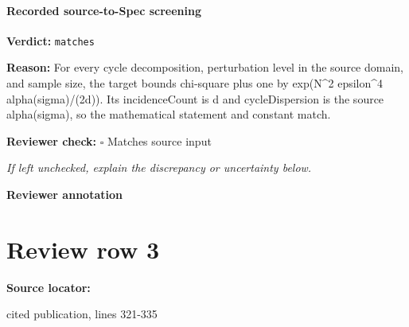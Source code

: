 \documentclass[10pt]{article}
\newcommand{\reviewerbox}{%
  \par\noindent\fbox{\parbox{0.96\linewidth}{\rule{0pt}{0.38in}}}\par
}
\newcommand{\reviewmatch}[1]{%
  \par\noindent\textbf{Reviewer check:} $\square$\; #1\par
  \noindent\emph{If left unchecked, explain the discrepancy or uncertainty below.}\par
}
\begin{document}
\paragraph{Recorded source-to-Spec screening}
\textbf{Verdict:} \texttt{matches}
\\
{\raggedright
\textbf{Reason:} For every cycle decomposition, perturbation level in the source domain, and sample size, the target bounds chi-\allowbreak{}square plus one by exp(N\textasciicircum{}2 epsilon\textasciicircum{}4 alpha(sigma)/\allowbreak{}(2d)).\allowbreak{} Its incidenceCount is d and cycleDispersion is the source alpha(sigma), so the mathematical statement and constant match.\allowbreak{}
\par}
\reviewmatch{Matches source input}
\noindent\textbf{Reviewer annotation}\par
\reviewerbox
\clearpage
\hypertarget{source-claim-0b1799dc95e4cecd}{}
\section*{Review row 3}
\textbf{Source locator:} {\footnotesize\raggedright cited publication, lines 321-\allowbreak{}335\par}
\end{document}

